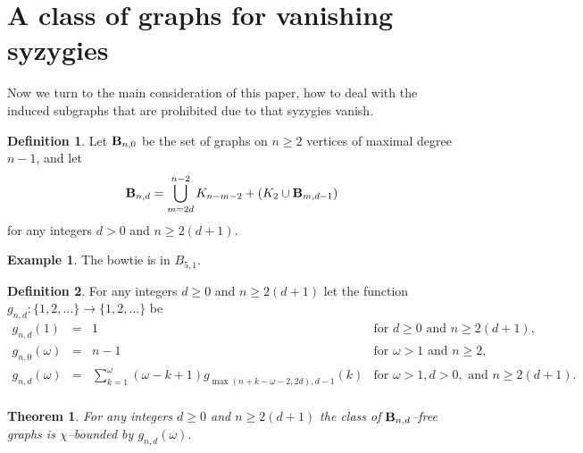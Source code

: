 \documentclass{article}
\theoremstyle{plain}
\newtheorem{thm}{Theorem}
\theoremstyle{definition}
\newtheorem{defn}{Definition}
\newtheorem{exa}{Example}
\begin{document}
\section{A class of graphs for vanishing syzygies}

Now we turn to the main consideration of this paper, how to deal with the induced subgraphs that are prohibited due to that syzygies vanish. 

\begin{defn}
Let ${\bf B}_{n,0}$ be the set of graphs on $n\geq 2$ vertices of maximal degree $n-1$, and let 
\[{\bf B}_{n,d} = \bigcup_{m=2d}^{n-2} K_{n-m-2}+(K_2\cup {\bf B}_{m,d-1}) \] for any integers $d>0$ and $n\geq 2(d+1).$
\end{defn}

\begin{exa}
The bowtie is in $B_{5,1}.$
\end{exa}

\begin{defn}
For any integers $d\geq 0$ and $n\geq 2(d+1)$ let the function $g_{n,d}: \{1,2,\ldots\} \rightarrow \{1,2,\ldots\}$ be
\[\begin{array}{rcll}
g_{n,d}(1) &= &1 & \textrm{for $d\geq 0$ and $n\geq 2(d+1),$} \\
g_{n,0}(\omega) &= & n-1 & \textrm{for $\omega > 1$ and $n\geq 2,$}\\
g_{n,d}(\omega) & = & \displaystyle  \sum_{k=1}^{\omega} (\omega-k+1) g_{\max(n+k-\omega-2,2d),d-1}( k ) &  \textrm{for $\omega > 1, d>0,$ and $n\geq 2(d+1).$}\\
\end{array}
\]
\end{defn}

\begin{thm}\label{bigthm}
For any integers $d\geq 0$ and $n\geq 2(d+1)$ the class of ${\bf B}_{n,d}$--free graphs is $\chi$--bounded by $g_{n,d}(\omega).$
\end{thm}
\end{document}
